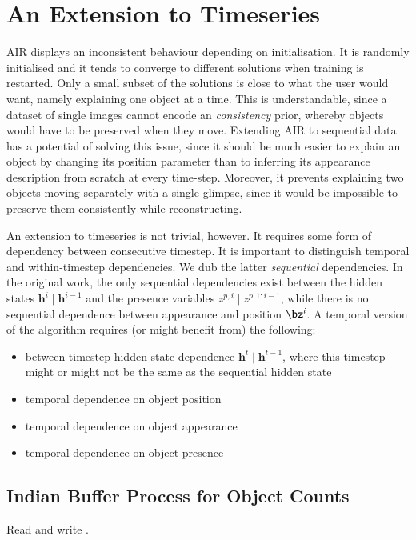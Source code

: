 \documentclass[]{article}
\begin{document}
\section{An Extension to Timeseries}
    AIR displays an inconsistent behaviour depending on initialisation. It is randomly initialised and it tends to converge to different solutions when training is restarted. Only a small subset of the solutions is close to what the user would want, namely explaining one object at a time. This is understandable, since a dataset of single images cannot encode an \emph{consistency} prior, whereby objects would have to be preserved when they move. Extending AIR to sequential data has a potential of solving this issue, since it should be much easier to explain an object by changing its position parameter than to inferring its appearance description from scratch at every time-step. Moreover, it prevents explaining two objects moving separately with a single glimpse, since it would be impossible to preserve them consistently while reconstructing.
    
    An extension to timeseries is not trivial, however. It requires some form of dependency between consecutive timestep. It is important to distinguish temporal and within-timestep dependencies. We dub the latter \emph{sequential} dependencies. In the original work, the only sequential dependencies exist between the hidden states $\bm{h}^i \mid \bm{h}^{i-1}$ and the presence variables $z^{p, i} \mid z^{p, 1:i-1}$, while there is no sequential dependence between appearance and position $\bz^i$. A temporal version of the algorithm requires (or might benefit from) the following:
    \begin{itemize}
        \item between-timestep hidden state dependence \eg $\bm{h}^t \mid \bm{h}^{t-1}$, where this timestep might or might not be the same as the sequential hidden state
        \item temporal dependence on object position
        \item temporal dependence on object appearance
        \item temporal dependence on object presence
        
    \end{itemize}
    
    \subsection{Indian Buffer Process for Object Counts}
        Read and write \citep{Gael2009}.
        
    
    
	\printbibliography
\end{document}
